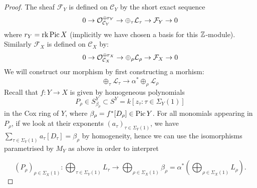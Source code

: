 \begin{proof}
The sheaf $\mathcal{F}_Y$ is defined on $\mathcal{C}_Y$ by the short exact sequence
\begin{equation*} 0 \rightarrow \mathcal{O}_{\mathcal{C}_Y}^{\oplus r_Y} \rightarrow \oplus_{\tau} \mathcal{L}_\tau \rightarrow \mathcal{F}_Y \rightarrow 0 \end{equation*}
where $r_Y = \operatorname{rk} \operatorname{Pic} X$ (implicitly we have chosen a basis for this $\mathbb{Z}$-module). Similarly $\mathcal{F}_{X}$ is defined on $\mathcal{C}_{X}$ by:
\begin{equation*} 0 \rightarrow \mathcal{O}_{\mathcal{C}_{X}}^{\oplus r_X} \rightarrow \oplus_{\rho} \mathcal{L}_\rho \rightarrow \mathcal{F}_{X} \rightarrow 0 \end{equation*}
We will construct our morphism by first constructing a morhism:
\begin{equation*} \oplus_{\tau} \mathcal{L}_\tau \to \alpha^* \oplus_{\rho} \mathcal{L}_\rho \end{equation*}
Recall that $f\colon Y\to X$ is given by homogeneous polynomials
\begin{equation*} P_\rho \in S^Y_{\beta_\rho} \subset S^Y = k[z_\tau : \tau \in \Sigma_Y(1)] \end{equation*}
in the Cox ring of $Y$, where $\beta_{\rho}=f^*[D_\rho] \in \operatorname{Pic} Y$. For all monomials appearing in $P_\rho$, if we look at their exponents $(a_{\tau})_{\tau\in\Sigma_Y(1)}$, we have $\sum_{\tau\in\Sigma_Y(1)}a_\tau[D_\tau]=\beta_\rho$ by homogeneity, hence we can use the isomorphisms parametrised by $M_Y$ as above in order to interpret

\begin{equation*} (P_\rho)_{\rho\in\Sigma_X(1)}\colon \bigoplus_{\tau\in\Sigma_Y(1)} L_{\tau}\to \bigoplus_{\rho\in\Sigma_X(1)} \beta_\rho=\alpha^* \left(\bigoplus_{\rho\in\Sigma_X(1)} L_\rho\right).\end{equation*}


\end{proof}
